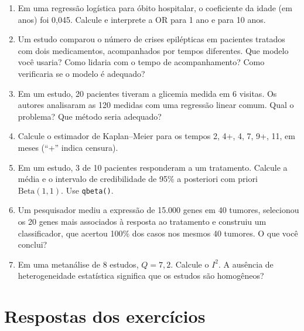 \documentclass[
]{book}
\begin{document}
\begin{enumerate}
\def\labelenumi{\arabic{enumi}.}
\item
  Em uma regressão logística para óbito hospitalar, o coeficiente da idade (em anos) foi 0,045. Calcule e interprete a OR para 1 ano e para 10 anos.
\item
  Um estudo comparou o número de crises epilépticas em pacientes tratados com dois medicamentos, acompanhados por tempos diferentes. Que modelo você usaria? Como lidaria com o tempo de acompanhamento? Como verificaria se o modelo é adequado?
\item
  Em um estudo, 20 pacientes tiveram a glicemia medida em 6 visitas. Os autores analisaram as 120 medidas com uma regressão linear comum. Qual o problema? Que método seria adequado?
\item
  Calcule o estimador de Kaplan--Meier para os tempos 2, 4+, 4, 7, 9+, 11, em meses (``+'' indica censura).
\item
  Em um estudo, 3 de 10 pacientes responderam a um tratamento. Calcule a média e o intervalo de credibilidade de 95\% a posteriori com priori \(\text{Beta}(1, 1)\). Use \texttt{qbeta()}.
\item
  Um pesquisador mediu a expressão de 15.000 genes em 40 tumores, selecionou os 20 genes mais associados à resposta ao tratamento e construiu um classificador, que acertou 100\% dos casos nos mesmos 40 tumores. O que você conclui?
\item
  Em uma metanálise de 8 estudos, \(Q = 7{,}2\). Calcule o \(I^2\). A ausência de heterogeneidade estatística significa que os estudos são homogêneos?
\end{enumerate}

\section{Respostas dos exercícios}\label{respostas-dos-exercuxedcios-9}
\end{document}
